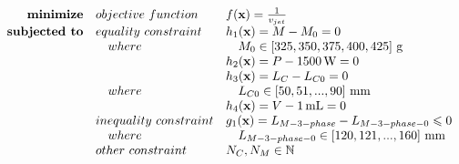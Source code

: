                 
                \begin{equation}
                    \begin{array}{rll}
                        \textbf{minimize}       & \small{objective\,\,function}     & f(\textbf{x})=\frac{1}{v_{jet}} \\
                        \textbf{subjected to}   & \small{equality\,\,constraint}    & h_1(\textbf{x})=M - M_0= 0\\
                                                &\quad \small{where}                &\quad  M_0\in\left[325,350,375,400,425\right]\,\mathrm{g}\\
                                                &                                   & h_2(\textbf{x})=P - 1500\,\mathrm{W}=0\\
                                                &                                   & h_3(\textbf{x})=L_{C} - L_{C0} = 0\\
                                                &\quad \small{where}                &\quad  L_{C0}\in\left[50,51,...,90\right]\,\mathrm{mm}\\
                                                &                                   & h_4(\textbf{x})=V - 1\,\mathrm{mL} = 0\\
                                                & \small{inequality\,\,constraint}  & g_1(\textbf{x})=L_{M-3-phase}-L_{M-3-phase-0} \leqslant 0\\
                                                &\quad \small{where}                &\quad L_{M-3-phase-0} \in \left[120,121,...,160\right]\,\mathrm{mm} \\
                                                & \small{other\,\,constraint}       & N_C, N_M \in 	\mathbb{N} \\
                    \end{array}
                    \label{eq:outer optimization for LTMFs}
                \end{equation}
                
